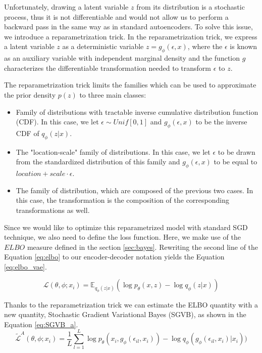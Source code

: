 Unfortunately, drawing a latent variable $z$ from its distribution is a stochastic process, thus it is not differentiable and would not allow us to perform a backward pass in the same way as in standard autoencoders.
To solve this issue, we introduce a reparametrization trick.
In the reparametrization trick, we express a latent variable $z$ as a deterministic variable $z = g_{\phi}(\epsilon, x)$, where the $\epsilon$ is known as an auxiliary variable with independent marginal density and the function $g$ characterizes the differentiable transformation needed to transform $\epsilon$ to $z$. 

The reparametrization trick limits the families which can be used to approximate the prior density $p(z)$ to three main classes:
\begin{itemize}
    \item Family of distributions with tractable inverse cumulative distribution function (CDF). In this case, we let $\epsilon \sim Unif[0, 1]$ and $g_{\phi}(\epsilon, x)$ to be the inverse CDF of $q_{\phi}(z|x)$.
    \item The "location-scale" family of distributions. In this case, we let $\epsilon$ to be drawn from the standardized distribution of this family and $g_{\phi}(\epsilon, x)$ to be equal to $location + scale \cdot \epsilon$.
    \item The family of distribution, which are composed of the previous two cases. In this case, the transformation is the composition of the corresponding transformations as well.
    \label{list:families}
\end{itemize}

\newpage
Since we would like to optimize this reparametrized model with standard SGD technique, we also need to define the loss function.
Here, we make use of the $ELBO$ measure defined in the section \ref{sec:bayes}.
Rewriting the second line of the Equation \ref{eq:elbo} to our encoder-decoder notation yields the Equation \ref{eq:elbo_vae}.

\begin{equation}
    \mathcal{L}(\theta, \phi; x_i) = \mathds{E}_{q_{\phi}(z|x)}(\log p_{\theta}(x, z) - \log q_{\phi}(z|x))
    \label{eq:elbo_vae}
\end{equation}

Thanks to the reparametrization trick we can estimate the ELBO quantity with a new quantity, Stochastic Gradient Variational Bayes (SGVB), as shown in the Equation \ref{eq:SGVB_a}. 
\begin{equation}
    \widetilde{\mathcal{L}}^A(\theta, \phi; x_i) = \frac{1}{L}\sum_{l=1}^{L} \log p_{\theta}(x_i, g_{\phi}(\epsilon_{il}, x_i)) - \log q_{\phi}(g_{\phi}(\epsilon_{il}, x_i)|x_i))
    \label{eq:SGVB_a}
\end{equation}

